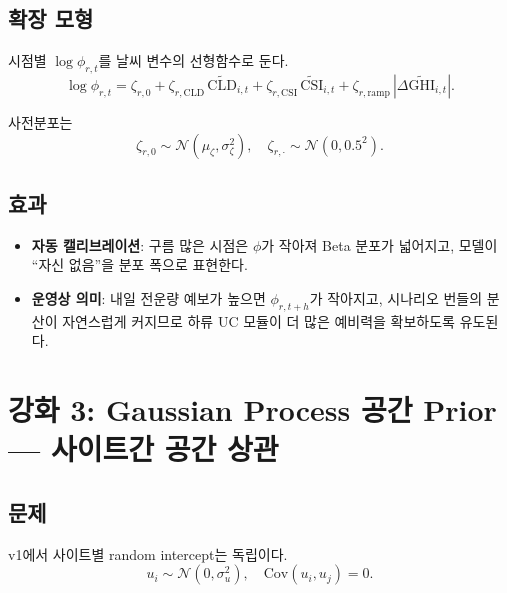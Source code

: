 \documentclass[11pt,a4paper]{article}
\begin{document}
\subsection{확장 모형}

시점별 $\log \phi_{r,t}$를 날씨 변수의 선형함수로 둔다.
\begin{equation}
    \log\phi_{r,t} = \zeta_{r,0} + \zeta_{r,\mathrm{CLD}}\,\widetilde{\mathrm{CLD}}_{i,t} + \zeta_{r,\mathrm{CSI}}\,\widetilde{\mathrm{CSI}}_{i,t} + \zeta_{r,\mathrm{ramp}}\,|\Delta \widetilde{\mathrm{GHI}}_{i,t}|.
    \label{eq:hetero_phi}
\end{equation}

사전분포는
\begin{equation}
    \zeta_{r,0}\sim\mathcal{N}(\mu_\zeta,\sigma^2_\zeta),\quad \zeta_{r,\cdot}\sim\mathcal{N}(0,0.5^2).
\end{equation}

\subsection{효과}

\begin{itemize}[leftmargin=2em]
    \item \textbf{자동 캘리브레이션}: 구름 많은 시점은 $\phi$가 작아져 Beta 분포가 넓어지고, 모델이 ``자신 없음''을 분포 폭으로 표현한다.
    \item \textbf{운영상 의미}: 내일 전운량 예보가 높으면 $\phi_{r,t+h}$가 작아지고, 시나리오 번들의 분산이 자연스럽게 커지므로 하류 UC 모듈이 더 많은 예비력을 확보하도록 유도된다.
\end{itemize}

\section{강화 3: Gaussian Process 공간 Prior --- 사이트간 공간 상관}

\subsection{문제}

v1에서 사이트별 random intercept는 독립이다.
\begin{equation}
    u_i\sim\mathcal{N}(0,\sigma^2_u),\quad \mathrm{Cov}(u_i,u_j)=0.
\end{equation}
\end{document}

